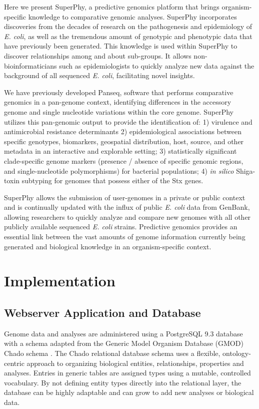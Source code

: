 \documentclass[doublespacing, linenumbers]{bmcart}
\begin{document}
Here we present SuperPhy, a predictive genomics platform that brings organism-specific knowledge to comparative genomic analyses. SuperPhy incorporates discoveries from the decades of research on the pathogenesis and epidemiology of \textit{E. coli}, as well as the tremendous amount of genotypic and phenotypic data that have previously been generated. This knowledge is used within SuperPhy to discover relationships among and about sub-groups. It allows non-bioinformaticians such as epidemiologists to quickly analyze new data against the background of all sequenced \textit{E. coli}, facilitating novel insights.

We have previously developed Panseq, software that performs comparative genomics in a  pan-genome context,  identifying differences in the accessory genome and single nucleotide variations within the core genome\cite{laing_pan-genome_2010}. SuperPhy utilizes this pan-genomic output to provide the identification of: 1) virulence and antimicrobial resistance determinants 2) epidemiological associations between specific genotypes, biomarkers, geospatial distribution, host, source, and other metadata in an interactive and explorable setting; 3) statistically significant clade-specific genome markers (presence / absence of specific genomic regions, and single-nucleotide polymorphisms) for bacterial populations; 4) \textit{in silico} Shiga-toxin subtyping for genomes that possess either of the Stx genes.

SuperPhy allows the submission of user-genomes in a private or public context and is continually updated with the influx of public \textit{E. coli} data from GenBank, allowing researchers to quickly analyze and compare new genomes with all other publicly available sequenced \textit{E. coli} strains. Predictive genomics provides an essential link between the vast amounts of genome information currently being generated and biological knowledge in an organism-specific context. 

\section{Implementation}
\subsection{Webserver Application and Database}

Genome data and analyses are administered using a PostgreSQL 9.3 database with a schema adapted from the Generic Model Organism Database (GMOD) Chado schema \cite{mungall_chado_2007}. The Chado relational database schema uses a flexible, ontology-centric approach to organizing biological entities, relationships, properties and analyses. Entries in generic tables are assigned types using a mutable, controlled vocabulary. By not defining entity types directly into the relational layer, the database can be highly adaptable and can grow to add new analyses or biological data.
\end{document}
